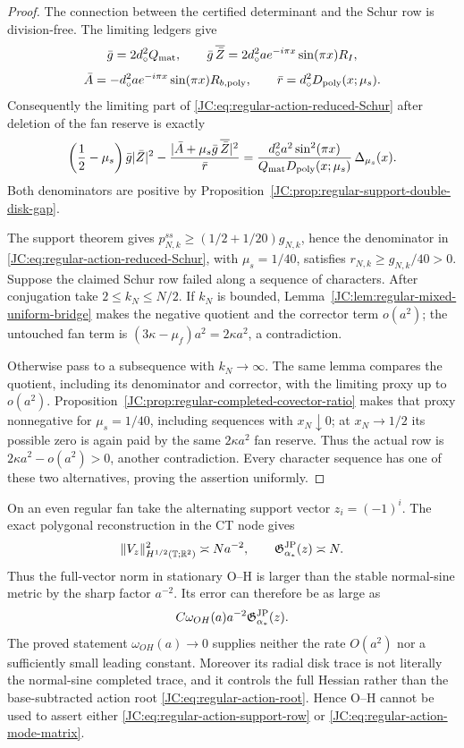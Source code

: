 \begin{proof}
The connection between the certified determinant and the Schur row is
division-free.  The limiting ledgers give
\[
 \bar g=2d_\circ^2Q_{\rm mat},\qquad
 \bar g\,\overline{\bar Z}
 =2d_\circ^2a e^{-i\pi x}\sin(\pi x)R_I,
\]
\[
 \bar A=-d_\circ^2a e^{-i\pi x}\sin(\pi x)R_{b,{\rm poly}},
 \qquad
 \bar r=d_\circ^2D_{\rm poly}(x;\mu_s).
\]
Consequently the limiting part of
\eqref{JC:eq:regular-action-reduced-Schur} after deletion of the fan reserve
is exactly
\begin{equation}\label{JC:eq:regular-proxy-Schur-determinant}
 \left(\frac12-\mu_s\right)\bar g|\bar Z|^2
 -\frac{|\bar A+\mu_s\bar g\,\overline{\bar Z}|^2}{\bar r}
 =\frac{d_\circ^2a^2\sin^2(\pi x)}
 {Q_{\rm mat}D_{\rm poly}(x;\mu_s)}\,\Delta_{\mu_s}(x).
\end{equation}
Both denominators are positive by
Proposition~\ref{JC:prop:regular-support-double-disk-gap}.

The support theorem gives
$p^{ss}_{N,k}\ge(1/2+1/20)g_{N,k}$, hence the denominator in
\eqref{JC:eq:regular-action-reduced-Schur}, with $\mu_s=1/40$, satisfies
$r_{N,k}\ge g_{N,k}/40>0$.  Suppose the claimed Schur row failed along a
sequence of characters.  After conjugation take $2\le k_N\le N/2$.
If $k_N$ is bounded, Lemma~\ref{JC:lem:regular-mixed-uniform-bridge} makes
the negative quotient and the corrector term $o(a^2)$; the untouched fan
term is $(3\kappa-\mu_f)a^2=2\kappa a^2$, a contradiction.

Otherwise pass to a subsequence with $k_N\to\infty$.  The same lemma
compares the quotient, including its denominator and corrector, with the
limiting proxy up to $o(a^2)$.  Proposition~\ref{JC:prop:regular-completed-covector-ratio}
makes that proxy nonnegative for $\mu_s=1/40$, including sequences with
$x_N\downarrow0$; at $x_N\to1/2$ its possible zero is again paid by the
same $2\kappa a^2$ fan reserve.  Thus the actual row is
$2\kappa a^2-o(a^2)>0$, another contradiction.  Every character sequence
has one of these two alternatives, proving the assertion uniformly.
\end{proof}

\begin{remark}
On an even regular fan take the alternating support vector
$z_i=(-1)^i$.  The exact polygonal reconstruction in the CT node gives
\[
 \|V_z\|_{H^{1/2}(\mathbb T;\mathbb R^2)}^2\asymp Na^{-2},
 \qquad
 \mathfrak G^{\rm JP}_{\alpha_*}(z)\asymp N.
\]
Thus the full-vector norm in stationary O--H is larger than the stable
normal-sine metric by the sharp factor $a^{-2}$.  Its error can therefore
be as large as
\[
 C\omega_{OH}(a)a^{-2}\mathfrak G^{\rm JP}_{\alpha_*}(z).
\]
The proved statement $\omega_{OH}(a)\to0$ supplies neither the rate
$O(a^2)$ nor a sufficiently small leading constant.  Moreover its radial
disk trace is not literally the normal-sine completed trace, and it
controls the full Hessian rather than the base-subtracted action root
\eqref{JC:eq:regular-action-root}.  Hence O--H cannot be used to assert either
\eqref{JC:eq:regular-action-support-row} or
\eqref{JC:eq:regular-action-mode-matrix}.
\end{remark}

